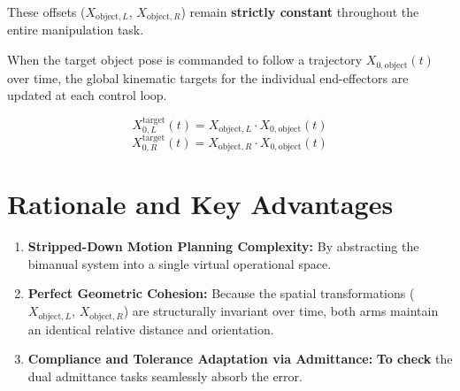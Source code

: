 \documentclass[11pt,a4paper]{article}
\begin{document}
These offsets ($X_{\text{object},L}$, $X_{\text{object},R}$) remain \textbf{strictly constant} throughout the entire manipulation task.

When the target object pose is commanded to follow a trajectory $X_{0,\text{object}}(t)$ over time, the global kinematic targets for the individual end-effectors are updated at each control loop.

\begin{equation}
X_{0,L}^{\text{target}}(t) = X_{\text{object}, L} \cdot X_{0,\text{object}}(t)
\end{equation}
\begin{equation}
X_{0,R}^{\text{target}}(t) = X_{\text{object}, R} \cdot X_{0,\text{object}}(t)
\end{equation}



\section{Rationale and Key Advantages}
\begin{enumerate}
    \item \textbf{Stripped-Down Motion Planning Complexity:} By abstracting the bimanual system into a single virtual operational space.
    \item \textbf{Perfect Geometric Cohesion:} Because the spatial transformations ($X_{\text{object},L}$, $X_{\text{object},R}$) are structurally invariant over time, both arms maintain an identical relative distance and orientation. 
    \item \textbf{Compliance and Tolerance Adaptation via Admittance:} \textbf{To check} the dual admittance tasks seamlessly absorb the error. 
\end{enumerate}


\newpage
\end{document}
